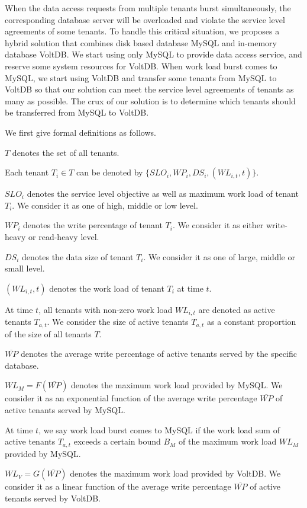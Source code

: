 \documentclass{article}
\begin{document}
When the data access requests from multiple tenants burst simultaneously, the corresponding database server will be overloaded and violate the service level agreements of some tenants. To handle this critical situation, we proposes a hybrid solution that combines disk based database MySQL and in-memory database VoltDB. We start using only MySQL to provide data access service, and reserve some system resources for VoltDB. When work load burst comes to MySQL, we start using VoltDB and transfer some tenants from MySQL to VoltDB so that our solution can meet the service level agreements of tenants as many as possible. The crux of our solution is to determine which tenants should be transferred from MySQL to VoltDB.

We first give formal definitions as follows.

$T$ denotes the set of all tenants.

Each tenant $T_i \in T$ can be denoted by $\{SLO_i, WP_i, DS_i, (WL_{i, t}, t)\}$.

$SLO_i$ denotes the service level objective as well as maximum work load of tenant $T_i$. We consider it as one of high, middle or low level.

$WP_i$ denotes the write percentage of tenant $T_i$. We consider it as either write-heavy or read-heavy level.

$DS_i$ denotes the data size of tenant $T_i$. We consider it as one of large, middle or small level.

$(WL_{i, t}, t)$ denotes the work load of tenant $T_i$ at time $t$.

At time $t$, all tenants with non-zero work load $WL_{i, t}$ are denoted as active tenants $T_{a, t}$. We consider the size of active tenants $T_{a, t}$ as a constant proportion of the size of all tenants $T$.

$\overline{WP}$ denotes the average write percentage of active tenants served by the specific database.

$WL_M = F(\overline{WP})$ denotes the maximum work load provided by MySQL. We consider it as an exponential function of the average write percentage $\overline{WP}$ of active tenants served by MySQL.

At time $t$, we say work load burst comes to MySQL if the work load sum of active tenants $T_{a, t}$ exceeds a certain bound $B_M$ of the maximum work load $WL_M$ provided by MySQL.

$WL_V = G(\overline{WP})$ denotes the maximum work load provided by VoltDB. We consider it as a linear function of the average write percentage $\overline{WP}$ of active tenants served by VoltDB.
\end{document}
